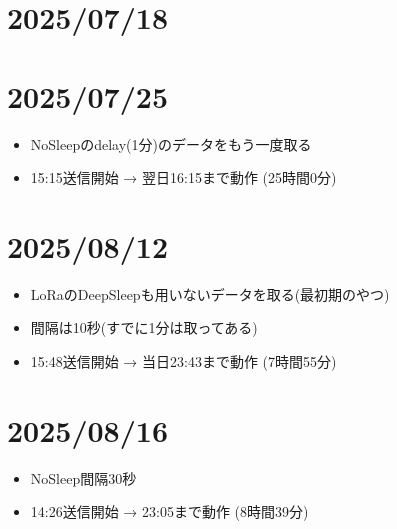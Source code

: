 \section{2025/07/18}

\section{2025/07/25}
\begin{itemize}
    \item NoSleepのdelay(1分)のデータをもう一度取る
    \item 15:15送信開始 → 翌日16:15まで動作 (25時間0分)
\end{itemize}

\section{2025/08/12}
\begin{itemize}
    \item LoRaのDeepSleepも用いないデータを取る(最初期のやつ)
    \item 間隔は10秒(すでに1分は取ってある)
    \item 15:48送信開始 → 当日23:43まで動作 (7時間55分)
\end{itemize}

\section{2025/08/16}
\begin{itemize}
    \item NoSleep間隔30秒
    \item 14:26送信開始 → 23:05まで動作 (8時間39分)
\end{itemize}




